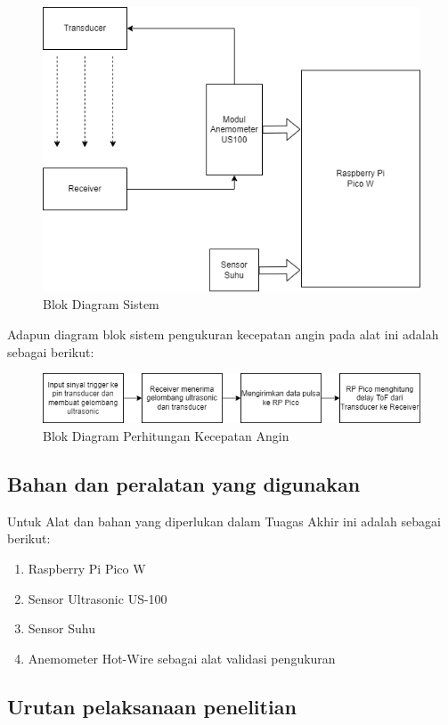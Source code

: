 \begin{figure}[h!]
	\centering
	\includegraphics[width=0.7\linewidth]{"gambar/Blok diagram anemometer ultrasonic"}
	\caption{Blok Diagram Sistem}
	\label{fig:blok-diagram-anemometer-ultrasonic}
\end{figure}

Adapun diagram blok sistem pengukuran kecepatan angin pada alat ini adalah sebagai berikut:

\begin{figure}[h!]
	\centering
	\includegraphics[width=0.7\linewidth]{"gambar/Diagram blok pengukuran kecepatan angin.drawio"}
	\caption{Blok Diagram Perhitungan Kecepatan Angin}
	\label{fig:diagram-blok-pengukuran-kecepatan-angin}
\end{figure}


\subsection{Bahan dan peralatan yang digunakan}

Untuk Alat dan bahan yang diperlukan dalam Tuagas Akhir ini adalah sebagai berikut:
\begin{enumerate}
  \item Raspberry Pi Pico W
  \item Sensor Ultrasonic US-100
  \item Sensor Suhu
  \item Anemometer Hot-Wire sebagai alat validasi pengukuran
\end{enumerate}

\subsection{Urutan pelaksanaan penelitian}

